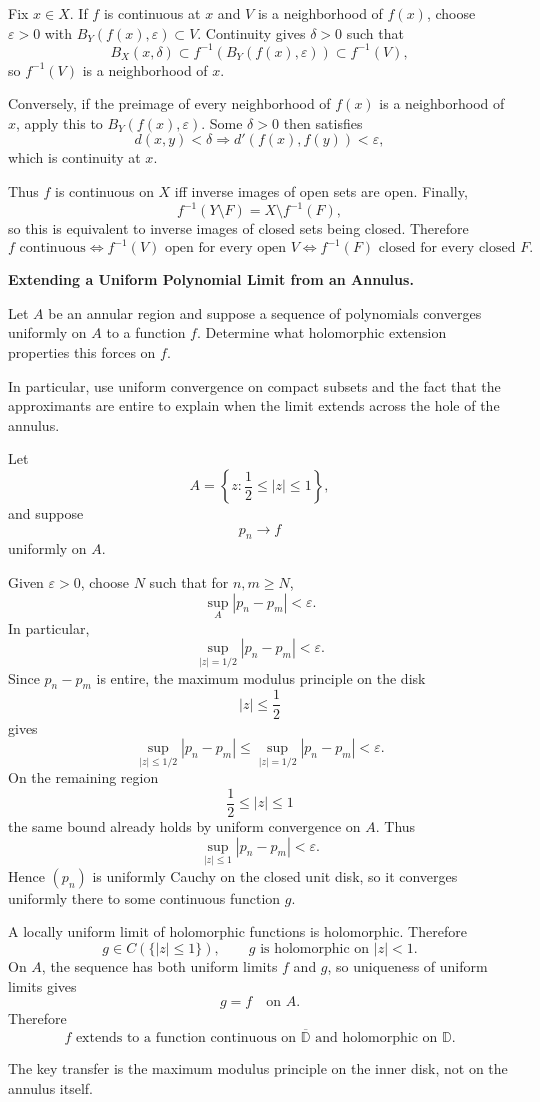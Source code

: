 \begin{solution}
Fix \(x\in X\). If \(f\) is continuous at \(x\) and \(V\) is a neighborhood of
\(f(x)\), choose \(\varepsilon>0\) with \(B_Y(f(x),\varepsilon)\subset V\). Continuity
gives \(\delta>0\) such that
\[
B_X(x,\delta)\subset f^{-1}(B_Y(f(x),\varepsilon))\subset f^{-1}(V),
\]
so \(f^{-1}(V)\) is a neighborhood of \(x\).

Conversely, if the preimage of every neighborhood of \(f(x)\) is a neighborhood of
\(x\), apply this to \(B_Y(f(x),\varepsilon)\). Some \(\delta>0\) then satisfies
\[
d(x,y)<\delta\Longrightarrow d'(f(x),f(y))<\varepsilon,
\]
which is continuity at \(x\).

Thus \(f\) is continuous on \(X\) iff inverse images of open sets are open. Finally,
\[
f^{-1}(Y\setminus F)=X\setminus f^{-1}(F),
\]
so this is equivalent to inverse images of closed sets being closed. Therefore
\[
\boxed{
f\text{ continuous}
\iff f^{-1}(V)\text{ open for every open }V
\iff f^{-1}(F)\text{ closed for every closed }F.
}
\]
\end{solution}

\begin{problem}[CP-II-0122]
\label{prob:cp-ii-0122}
\textbf{Extending a Uniform Polynomial Limit from an Annulus.}

\hspace*{1.5em}Let \(A\) be an annular region and suppose a sequence of polynomials converges
uniformly on \(A\) to a function \(f\). Determine what holomorphic extension
properties this forces on \(f\).

In particular, use uniform convergence on compact subsets and the fact that the
approximants are entire to explain when the limit extends across the hole of
the annulus.
\end{problem}

\begin{solution}
Let
\[
A=\left\{z:\frac12\le|z|\le1\right\},
\]
and suppose
\[
p_n\longrightarrow f
\]
uniformly on \(A\).

Given \(\varepsilon>0\), choose \(N\) such that for \(n,m\ge N\),
\[
\sup_{A}|p_n-p_m|<\varepsilon.
\]
In particular,
\[
\sup_{|z|=1/2}|p_n-p_m|<\varepsilon.
\]
Since \(p_n-p_m\) is entire, the maximum modulus principle on the disk
\[
|z|\le\frac12
\]
gives
\[
\sup_{|z|\le1/2}|p_n-p_m|
\le
\sup_{|z|=1/2}|p_n-p_m|
<
\varepsilon.
\]
On the remaining region
\[
\frac12\le|z|\le1
\]
the same bound already holds by uniform convergence on \(A\). Thus
\[
\sup_{|z|\le1}|p_n-p_m|<\varepsilon.
\]
Hence \((p_n)\) is uniformly Cauchy on the closed unit disk, so it converges uniformly there to some continuous function \(g\).

A locally uniform limit of holomorphic functions is holomorphic. Therefore
\[
g\in C(\{|z|\le1\}),
\qquad
g\text{ is holomorphic on }|z|<1.
\]
On \(A\), the sequence has both uniform limits \(f\) and \(g\), so uniqueness of uniform limits gives
\[
g=f\quad\text{on }A.
\]
Therefore
\[
\boxed{
f\text{ extends to a function continuous on }\overline{\mathbb D}
\text{ and holomorphic on }\mathbb D.
}
\]

The key transfer is the maximum modulus principle on the inner disk, not on the annulus itself.
\end{solution}


